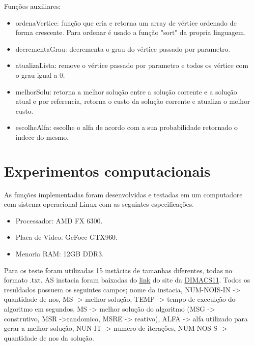 \documentclass[12pt, fleqn]{article}
\begin{document}
	
	\quad Funções auxiliares: 
	  \begin{itemize}
	    \item ordenaVertice: função que cria e retorna um array de vértice ordenado de forma crescente. Para ordenar é usado a função "sort" da propria linguagem.	      
	    \item decrementaGrau: decrementa o grau do vértice passado por parametro.
	    \item atualizaLista: remove o vértice passado por parametro e todos os vértice com o grau igual a 0.
	    \item melhorSolu: retorna a melhor solução entre a solução corrente e a solução atual e por referencia, retorna o custo da solução corrente e atualiza o melhor custo.
	    \item escolheAlfa: escolhe o alfa de acordo com a sua probabilidade retornado o indece do mesmo.
	     
	  \end{itemize}

    \section{Experimentos computacionais}
      \quad As funções implementadas foram desenvolvidas e testadas em um computadore com sistema operacional Linux com as seguintes especificações.
      \begin{itemize}
	  \item Processador: AMD FX 6300.
	  \item Placa de Video: GeFoce GTX960.
	  \item Menoria RAM: 12GB DDR3.
      \end{itemize}
      
      \par Para os teste foram utilizadas 15 instâcias de tamanhas diferentes, todas no formato .txt. AS instacia foram baixadas do \href{http://dimacs11.cs.princeton.edu/instances/SPG-PUCN.zip}{link} do site da \href{http://dimacs11.cs.princeton.edu/downloads.html}{DIMACS11}.     
      Todos os resuldados possuem os seguintes campos; nome da instacia, NUM-NOIS-IN -> quantidade de nos, MS -> melhor solução,
      TEMP -> tempo de execulção do algoritmo em segundos, MS -> melhor solução do algoritmo (MSG -> construtivo, MSR ->randomico, MSRE -> reativo),
      ALFA -> alfa utilizado para gerar a melhor solução, NUN-IT -> numero de iterações, NUM-NOS-S -> quantidade de nos da solução.
      
\end{document}
